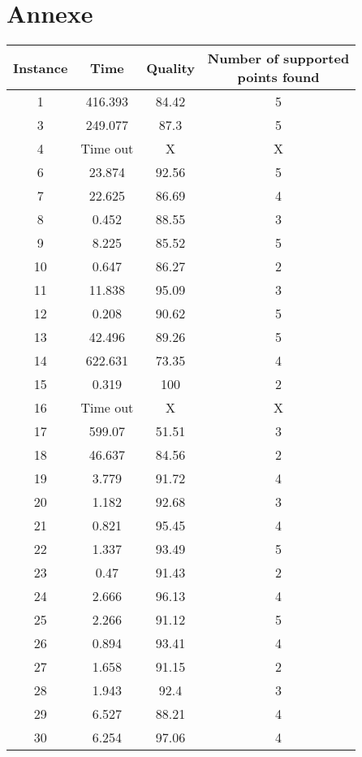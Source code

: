 \section{Annexe}
\begin{table}[!ht]
    \centering
    \begin{tabular}{|c|c|c|c|}
        \hline
        Instance & Time & Quality &  \makecell{Number of supported\\ points found} \\ 
        \hline
        1 & 416.393 & 84.42 & 5 \\ 
        3 & 249.077 & 87.3 & 5 \\
        \rowcolor{gray!25} 
        4 & Time out & X & X \\ 
        6 & 23.874 & 92.56 & 5 \\ 
        7 & 22.625 & 86.69 & 4 \\ 
        8 & 0.452 & 88.55 & 3 \\ 
        9 & 8.225 & 85.52 & 5 \\ 
        10 & 0.647 & 86.27 & 2 \\ 
        11 & 11.838 & 95.09 & 3 \\ 
        12 & 0.208 & 90.62 & 5 \\ 
        13 & 42.496 & 89.26 & 5 \\ 
        14 & 622.631 & 73.35 & 4 \\ 
        15 & 0.319 & 100 & 2 \\ 
        \rowcolor{gray!25} 16 & Time out & X & X \\ 
        17 & 599.07 & 51.51 & 3 \\ 
        18 & 46.637 & 84.56 & 2 \\ 
        19 & 3.779 & 91.72 & 4 \\ 
        20 & 1.182 & 92.68 & 3 \\ 
        21 & 0.821 & 95.45 & 4 \\ 
        22 & 1.337 & 93.49 & 5 \\ 
        23 & 0.47 & 91.43 & 2 \\ 
        24 & 2.666 & 96.13 & 4 \\ 
        25 & 2.266 & 91.12 & 5 \\ 
        26 & 0.894 & 93.41 & 4 \\ 
        27 & 1.658 & 91.15 & 2 \\ 
        28 & 1.943 & 92.4 & 3 \\ 
        29 & 6.527 & 88.21 & 4 \\ 
        30 & 6.254 & 97.06 & 4 \\ 

\end{tabular}
\end{table}
